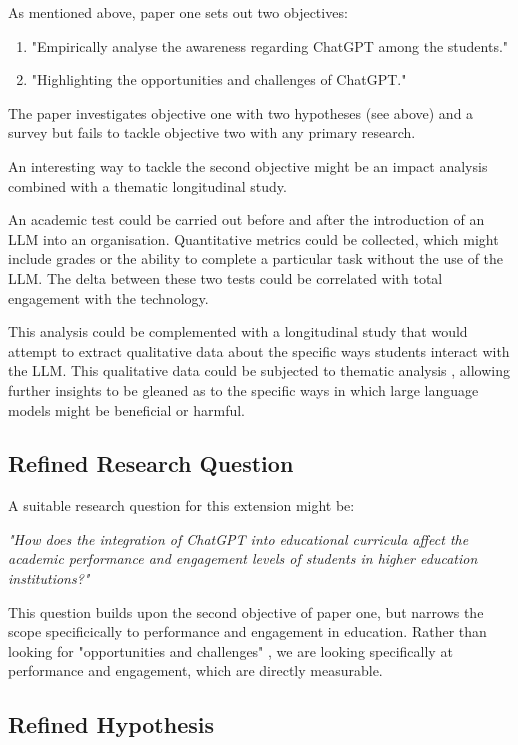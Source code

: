 \documentclass[12pt]{article}
\begin{document}
As mentioned above, paper one sets out two objectives:

\begin{enumerate}
    \item "Empirically analyse the awareness regarding ChatGPT among the students."
    \item "Highlighting the opportunities and challenges of ChatGPT." \cite{paper2}
\end{enumerate}

The paper investigates objective one with two hypotheses (see above) and a survey but fails to tackle objective two with any primary research.

An interesting way to tackle the second objective might be an impact analysis combined with a thematic longitudinal study. 

An academic test could be carried out before and after the introduction of an LLM into an organisation. Quantitative metrics could be collected, which might include grades or the ability to complete a particular task without the use of the LLM. The delta between these two tests could be correlated with total engagement with the technology.

This analysis could be complemented with a longitudinal study that would attempt to extract qualitative data about the specific ways students interact with the LLM. This qualitative data could be subjected to thematic analysis \cite{taguette}, allowing further insights to be gleaned as to the specific ways in which large language models might be beneficial or harmful.

\subsection{Refined Research Question}

A suitable research question for this extension might be:

\textit{"How does the integration of ChatGPT into educational curricula affect the academic performance and engagement levels of students in higher education institutions?"}

This question builds upon the second objective of paper one, but narrows the scope specificically to performance and engagement in education. Rather than looking for "opportunities and challenges" \cite{paper1}, we are looking specifically at performance and engagement, which are directly measurable.

\subsection{Refined Hypothesis}
\end{document}
